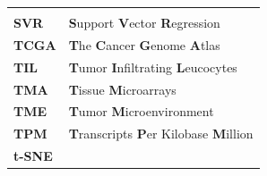\documentclass[12pt,]{book}
\theoremstyle{definition}
\theoremstyle{definition}
\theoremstyle{definition}
\theoremstyle{remark}
\begin{document}
\begin{longtable}[]{@{}ll@{}}
\begin{minipage}[t]{0.80\columnwidth}
\end{minipage}\tabularnewline
\begin{minipage}[t]{0.14\columnwidth}\raggedright
\textbf{SVR}\strut
\end{minipage} & \begin{minipage}[t]{0.80\columnwidth}\raggedright
\textbf{S}upport \textbf{V}ector \textbf{R}egression\strut
\end{minipage}\tabularnewline
\begin{minipage}[t]{0.14\columnwidth}\raggedright
\textbf{TCGA}\strut
\end{minipage} & \begin{minipage}[t]{0.80\columnwidth}\raggedright
\textbf{T}he \textbf{C}ancer \textbf{G}enome \textbf{A}tlas\strut
\end{minipage}\tabularnewline
\begin{minipage}[t]{0.14\columnwidth}\raggedright
\textbf{TIL}\strut
\end{minipage} & \begin{minipage}[t]{0.80\columnwidth}\raggedright
\textbf{T}umor \textbf{I}nfiltrating \textbf{L}eucocytes\strut
\end{minipage}\tabularnewline
\begin{minipage}[t]{0.14\columnwidth}\raggedright
\textbf{TMA}\strut
\end{minipage} & \begin{minipage}[t]{0.80\columnwidth}\raggedright
\textbf{T}issue \textbf{M}icroarrays\strut
\end{minipage}\tabularnewline
\begin{minipage}[t]{0.14\columnwidth}\raggedright
\textbf{TME }\strut
\end{minipage} & \begin{minipage}[t]{0.80\columnwidth}\raggedright
\textbf{T}umor \textbf{M}icroenvironment\strut
\end{minipage}\tabularnewline
\begin{minipage}[t]{0.14\columnwidth}\raggedright
\textbf{TPM}\strut
\end{minipage} & \begin{minipage}[t]{0.80\columnwidth}\raggedright
\textbf{T}ranscripts \textbf{P}er Kilobase \textbf{M}illion\strut
\end{minipage}\tabularnewline
\begin{minipage}[t]{0.14\columnwidth}\raggedright
\textbf{t-SNE}\strut
\end{minipage} & \begin{minipage}[t]{0.80\columnwidth}\raggedright

\end{minipage}
\end{longtable}
\end{document}
